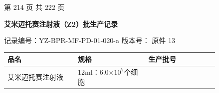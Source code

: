 \documentclass[UTF8,10pt,a4paper,fontset=fandol]{ctexart}
\newcommand{\fieldvalue}[1]{#1}
\begin{document}
\normalsize
\begin{center}
第 214 页 共 222 页
\end{center}


\newpage

\begin{center}
\textbf{艾米迈托赛注射液（Z2）批生产记录}
\end{center}

\noindent
记录编号：YZ-BPR-MF-PD-01-020-a\hfill
版本号：
\fieldvalue{原件}
\hspace{1em}
\fieldvalue{13}

\medskip

\begin{center}
\begin{tabular}{|p{0.28\linewidth}|p{0.28\linewidth}|p{0.28\linewidth}|}
\hline
品名 & 规格 & 生产批号 \\ \hline
艾米迈托赛注射液 & 12ml：6.0$\times 10^{7}$个细胞 &  \\ \hline
\end{tabular}
\end{center}

\medskip
\end{document}
